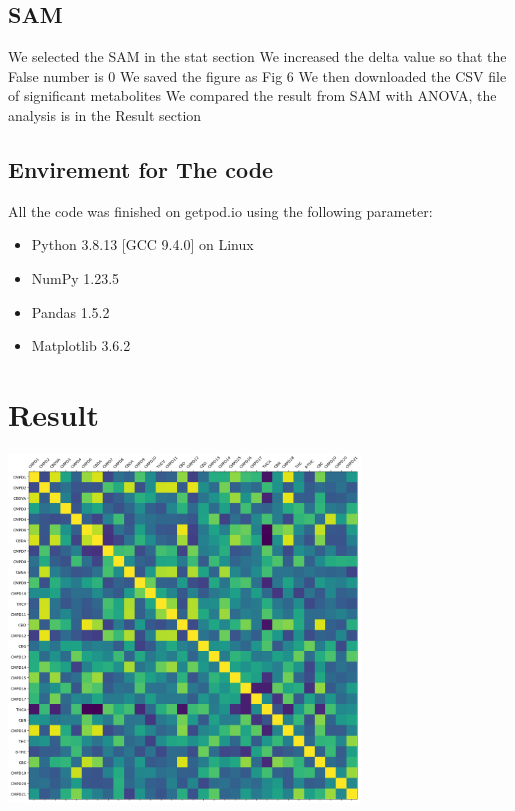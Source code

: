 \documentclass{article}
\begin{document}
\subsection*{SAM}
\begin{enumerate}
     We selected the SAM in the stat section
     We increased the delta value so that the False number is 0
     We saved the figure as Fig 6
     We then downloaded the CSV file of significant metabolites
     We compared the result from SAM with ANOVA, the analysis is in the Result section
\end{enumerate}

\subsection*{Envirement for The code} 
All the code was finished on getpod.io using the following parameter:
\begin{itemize}
    \item Python 3.8.13 [GCC 9.4.0] on Linux
    \item NumPy 1.23.5
    \item Pandas 1.5.2
    \item Matplotlib 3.6.2
\end{itemize}

\section{Result}

\centering
\includegraphics[width=0.7\textwidth]{output.png}

\end{document}
